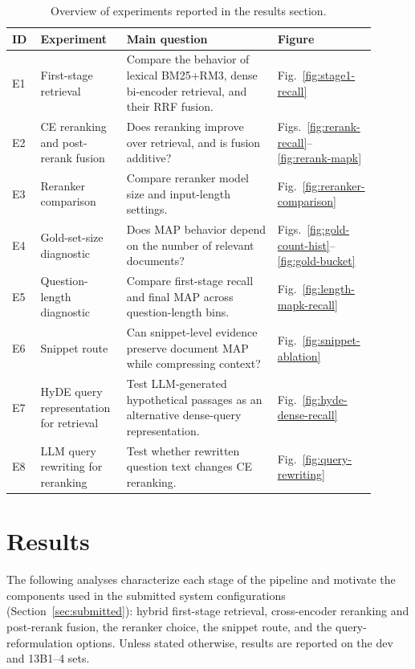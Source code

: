 \documentclass[
]{ceurart}
\begin{document}
\begin{table}[!htbp]
  \centering
  \caption{Overview of experiments reported in the results section.}
  \label{tab:experiment-map}
  \small
  \begin{tabular}{@{}p{0.08\linewidth}p{0.24\linewidth}p{0.46\linewidth}p{0.12\linewidth}@{}}
    \toprule
    ID & Experiment & Main question & Figure \\
    \midrule
    E1 & First-stage retrieval & Compare the behavior of lexical BM25+RM3, dense bi-encoder retrieval, and their RRF fusion. & Fig.~\ref{fig:stage1-recall} \\
    E2 & CE reranking and post-rerank fusion & Does reranking improve over retrieval, and is fusion additive? & Figs.~\ref{fig:rerank-recall}--\ref{fig:rerank-mapk} \\
    E3 & Reranker comparison & Compare reranker model size and input-length settings. & Fig.~\ref{fig:reranker-comparison} \\
    E4 & Gold-set-size diagnostic & Does MAP behavior depend on the number of relevant documents? & Figs.~\ref{fig:gold-count-hist}--\ref{fig:gold-bucket} \\
    E5 & Question-length diagnostic & Compare first-stage recall and final MAP across question-length bins. & Fig.~\ref{fig:length-mapk-recall} \\
    E6 & Snippet route & Can snippet-level evidence preserve document MAP while compressing context? & Fig.~\ref{fig:snippet-ablation} \\
    E7 & HyDE query representation for retrieval & Test LLM-generated hypothetical passages as an alternative dense-query representation. & Fig.~\ref{fig:hyde-dense-recall} \\
    E8 & LLM query rewriting for reranking & Test whether rewritten question text changes CE reranking. & Fig.~\ref{fig:query-rewriting} \\
    \bottomrule
  \end{tabular}
\end{table}

\section{Results}
\label{sec:results}

The following analyses characterize each stage of the pipeline and motivate the components used in the submitted system configurations (Section~\ref{sec:submitted}): hybrid first-stage retrieval, cross-encoder reranking and post-rerank fusion, the reranker choice, the snippet route, and the query-reformulation options. Unless stated otherwise, results are reported on the dev and 13B1--4 sets.
\end{document}
